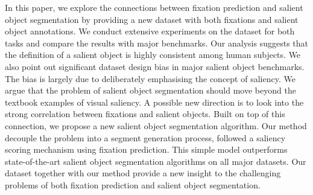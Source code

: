 In this paper, we explore the connections between fixation prediction and salient object segmentation by providing a new dataset with both fixations and salient object annotations. We conduct extensive experiments on the dataset for both tasks and compare the results with major benchmarks. Our analysis suggests that the definition of a salient object is highly consistent among human subjects. We also point out significant dataset design bias in major salient object benchmarks. The bias is largely due to deliberately emphasising the concept of saliency. We argue that the problem of salient object segmentation should move beyond the textbook examples of visual saliency. A possible new direction is to look into the strong correlation between fixations and salient objects. Built on top of this connection, we propose a new salient object segmentation algorithm. Our method decouple the problem into a segment generation process, followed a saliency scoring mechanism using fixation prediction. This simple model outperforms state-of-the-art salient object segmentation algorithms on all major datasets. Our dataset together with our method provide a new insight to the challenging problems of both fixation prediction and salient object segmentation.


